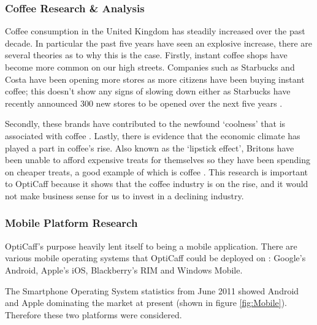 \subsubsection{Coffee Research \& Analysis}
Coffee consumption in the United Kingdom has steadily increased over the past decade. 
In particular the past five years have seen an explosive increase, there are several theories as to why this is the case.
Firstly, instant coffee shops have become more common on our high streets. 
Companies such as Starbucks and Costa have been opening more stores as more citizens have been buying instant coffee; this doesn’t show any signs of slowing down either as Starbucks have recently announced 300 new stores to be opened over the next five years \cite{starbucks}.

Secondly, these brands have contributed to the newfound ‘coolness’ that is associated with coffee \cite{popular}. 
Lastly, there is evidence that the economic climate has played a part in coffee’s rise. 
Also known as the ‘lipstick effect’, Britons have been unable to afford expensive treats for themselves so they have been spending on cheaper treats, a good example of which is coffee \cite{costa}.
This research is important to OptiCaff because it shows that the coffee industry is on the rise, and it would not make business sense for us to invest in a declining industry.

\subsubsection{Mobile Platform Research}
\label{sec:Mobile}
OptiCaff’s purpose heavily lent itself to being a mobile application. 
There are various mobile operating systems that OptiCaff could be deployed on \cite{differentOS}: Google's Android, Apple's iOS, Blackberry's RIM and Windows Mobile. 

The Smartphone Operating System statistics from June 2011 showed Android and Apple dominating the market at present (shown in figure \ref{fig:Mobile}).
Therefore these two platforms were considered.

